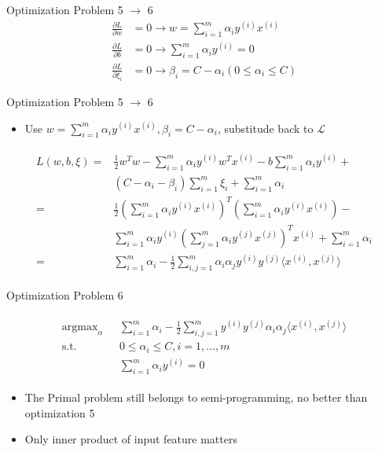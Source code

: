 \documentclass{beamer}
\begin{document}
\begin{frame}{Optimization Problem 5 $\to$ 6}
\begin{align}
\frac{\partial L}{\partial w}&=0\to w = \sum_{i=1}^m\alpha_iy^{(i)}x^{(i)}\\
\frac{\partial L}{\partial b}&=0\to\sum_{i=1}^m\alpha_iy^{(i)}=0\\
\frac{\partial L}{\partial \xi_i}&=0\to\beta_i= C-\alpha_i(0\leq\alpha_i\leq C)
\end{align}
\end{frame}

\begin{frame}{Optimization Problem 5 $\to$ 6}
\begin{itemize}
\item Use $w = \sum_{i=1}^m\alpha_iy^{(i)}x^{(i)}, \beta_i= C-\alpha_i$, substitude back to $\mathcal{L}$
\end{itemize}
\begin{align*}
\begin{split}
L(w, b, \xi) =& \frac{1}{2}w^Tw -\sum_{i=1}^m\alpha_iy^{(i)}w^Tx^{(i)}-b\sum_{i=1}^m\alpha_iy^{(i)}+\\ &(C-\alpha_i-\beta_i)\sum_{i=1}^m\xi_i+\sum_{i=1}^m\alpha_i\\
=&\frac{1}{2}\left(\sum_{i=1}^m\alpha_iy^{(i)}x^{(i)}\right)^T\left(\sum_{i=1}^m\alpha_iy^{(i)}x^{(i)}\right)-\\
&\sum_{i=1}^m\alpha_iy^{(i)}\left(\sum_{j=1}^m\alpha_iy^{(j)}x^{(j)}\right)^Tx^{(i)} +\sum_{i=1}^m\alpha_i\\
=&\sum_{i=1}^m\alpha_i-\frac{1}{2}\sum_{i,j=1}^m\alpha_i\alpha_jy^{(i)}y^{(j)}\langle x^{(i)}, x^{(j)}\rangle
\end{split}
\end{align*}
\end{frame}

\begin{frame}{Optimization Problem 6}

\begin{align*}
\begin{split}
\text{argmax}_{\alpha}\text{   }&\sum_{i=1}^m\alpha_i - \frac{1}{2}\sum_{i,j=1}^my^{(i)}y^{(j)}\alpha_i\alpha_j\langle x^{(i)}, x^{(j)}\rangle \\
\text{s.t.} \text{   }&0\leq \alpha_i \leq C, i=1,...,m\\
&\sum_{i=1}^m\alpha_iy^{(i)}=0
\end{split}
\end{align*}
\begin{itemize}
	\item The Primal problem still belongs to semi-programming, no better than optimization 5
	\item Only inner product of input feature matters
\end{itemize}
\end{frame}
\end{document}
